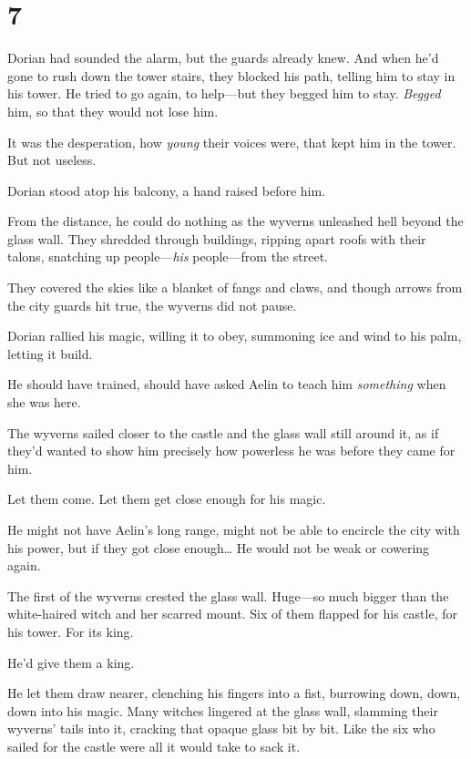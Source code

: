 
\chapter{7}

Dorian had sounded the alarm, but the guards already knew.
And when he'd gone to rush down the tower stairs, they blocked his path, telling him to stay in his tower.
He tried to go again, to help---but they begged him to stay.
\emph{Begged} him, so that they would not lose him.

It was the desperation, how \emph{young} their voices were, that kept him in the tower.
But not useless.

Dorian stood atop his balcony, a hand raised before him.

From the distance, he could do nothing as the wyverns unleashed hell beyond the glass wall.
They shredded through buildings, ripping apart roofs with their talons, snatching up people---\emph{his} people---from the street.

They covered the skies like a blanket of fangs and claws, and though arrows from the city guards hit true, the wyverns did not pause.

Dorian rallied his magic, willing it to obey, summoning ice and wind to his palm, letting it build.

He should have trained, should have asked Aelin to teach him \emph{something} when she was here.

The wyverns sailed closer to the castle and the glass wall still around it, as if they'd wanted to show him precisely how powerless he was before they came for him.

Let them come.
Let them get close enough for his magic.

He might not have Aelin's long range, might not be able to encircle the city with his power, but if they got close enough\ldots{} He would not be weak or cowering again.

The first of the wyverns crested the glass wall.
Huge---so much bigger than the white-haired witch and her scarred mount.
Six of them flapped for his castle, for his tower.
For its king.

He'd give them a king.

He let them draw nearer, clenching his fingers into a fist, burrowing down, down, down into his magic.
Many witches lingered at the glass wall, slamming their wyverns' tails into it, cracking that opaque glass bit by bit.
Like the six who sailed for the castle were all it would take to sack it.

